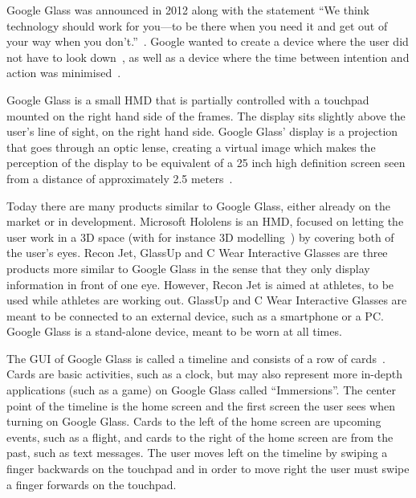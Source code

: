 Google Glass was announced in 2012 along with the statement ``We think technology should work for you---to be there when you need it and get out of your way when you don't.''~\cite{GoogleGlassAnnouncement}. Google wanted to create a device where the user did not have to look down~\cite{tedtalkWhyGlass}, as well as a device where the time between intention and action was minimised~\cite{6504855}. 

Google Glass %
is a small HMD that is partially controlled with a touchpad mounted on the right hand side of the frames. The display sits slightly above the user's line of sight, on the right hand side. Google Glass' display is a projection that goes through an optic lense, creating a virtual image which makes the perception of the display to be equivalent of a 25 inch high definition screen seen from a distance of approximately 2.5 meters~\cite{GlassSpecs}.

Today there are many products similar to Google Glass, either already on the market or in development. Microsoft Hololens is an HMD, focused on letting the user work in a 3D space (with for instance 3D modelling~\cite{hololensDemo}) by covering both of the user's eyes. Recon Jet, GlassUp and C Wear Interactive Glasses are three products more similar to Google Glass in the sense that they only display information in front of one eye. However, Recon Jet is aimed at athletes, to be used while athletes are working out. GlassUp and C Wear Interactive Glasses are meant to be connected to an external device, such as a smartphone or a PC. Google Glass is a stand-alone device, meant to be worn at all times.

The GUI of Google Glass is called a timeline and consists of a row of cards~\cite{ImagesGoogleGlassUI}. Cards are basic activities, such as a clock, but may also represent more in-depth applications (such as a game) on Google Glass called ``Immersions''. The center point of the timeline is the home screen and the first screen the user sees when turning on Google Glass. Cards to the left of the home screen are upcoming events, such as a flight, and cards to the right of the home screen are from the past, such as text messages. The user moves left on the timeline by swiping a finger backwards on the touchpad and in order to move right the user must swipe a finger forwards on the touchpad. 

